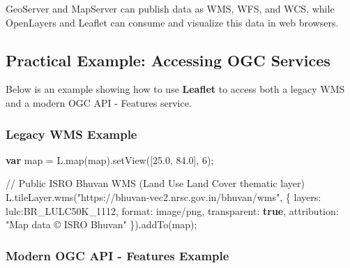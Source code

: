 \documentclass[
  11pt,
  letterpaper,
]{book}
\newenvironment{Shaded}{\begin{snugshade}}{\end{snugshade}}
\newcommand{\AttributeTok}[1]{\textcolor[rgb]{0.40,0.45,0.13}{#1}}
\newcommand{\CommentTok}[1]{\textcolor[rgb]{0.37,0.37,0.37}{#1}}
\newcommand{\DataTypeTok}[1]{\textcolor[rgb]{0.68,0.00,0.00}{#1}}
\newcommand{\DecValTok}[1]{\textcolor[rgb]{0.68,0.00,0.00}{#1}}
\newcommand{\FloatTok}[1]{\textcolor[rgb]{0.68,0.00,0.00}{#1}}
\newcommand{\FunctionTok}[1]{\textcolor[rgb]{0.28,0.35,0.67}{#1}}
\newcommand{\KeywordTok}[1]{\textcolor[rgb]{0.00,0.23,0.31}{\textbf{#1}}}
\newcommand{\NormalTok}[1]{\textcolor[rgb]{0.00,0.23,0.31}{#1}}
\newcommand{\OperatorTok}[1]{\textcolor[rgb]{0.37,0.37,0.37}{#1}}
\newcommand{\StringTok}[1]{\textcolor[rgb]{0.13,0.47,0.30}{#1}}
\begin{document}
GeoServer and MapServer can publish data as WMS, WFS, and WCS, while
OpenLayers and Leaflet can consume and visualize this data in web
browsers.

\subsection{Practical Example: Accessing OGC
Services}\label{practical-example-accessing-ogc-services}

Below is an example showing how to use \textbf{Leaflet} to access both a
legacy WMS and a modern OGC API - Features service.

\subsubsection{Legacy WMS Example}\label{legacy-wms-example}

\begin{Shaded}
\begin{Highlighting}[]
\KeywordTok{var}\NormalTok{ map }\OperatorTok{=}\NormalTok{ L}\OperatorTok{.}\FunctionTok{map}\NormalTok{(}\StringTok{\textquotesingle{}map\textquotesingle{}}\NormalTok{)}\OperatorTok{.}\FunctionTok{setView}\NormalTok{([}\FloatTok{25.0}\OperatorTok{,} \FloatTok{84.0}\NormalTok{]}\OperatorTok{,} \DecValTok{6}\NormalTok{)}\OperatorTok{;}

\CommentTok{// Public ISRO Bhuvan WMS (Land Use Land Cover thematic layer)}
\NormalTok{L}\OperatorTok{.}\AttributeTok{tileLayer}\OperatorTok{.}\FunctionTok{wms}\NormalTok{(}\StringTok{"https://bhuvan{-}vec2.nrsc.gov.in/bhuvan/wms"}\OperatorTok{,}\NormalTok{ \{}
  \DataTypeTok{layers}\OperatorTok{:} \StringTok{\textquotesingle{}lulc:BR\_LULC50K\_1112\textquotesingle{}}\OperatorTok{,}
  \DataTypeTok{format}\OperatorTok{:} \StringTok{\textquotesingle{}image/png\textquotesingle{}}\OperatorTok{,}
  \DataTypeTok{transparent}\OperatorTok{:} \KeywordTok{true}\OperatorTok{,}
  \DataTypeTok{attribution}\OperatorTok{:} \StringTok{"Map data © ISRO Bhuvan"}
\NormalTok{\})}\OperatorTok{.}\FunctionTok{addTo}\NormalTok{(map)}\OperatorTok{;}
\end{Highlighting}
\end{Shaded}

\subsubsection{Modern OGC API - Features
Example}\label{modern-ogc-api---features-example}
\end{document}
